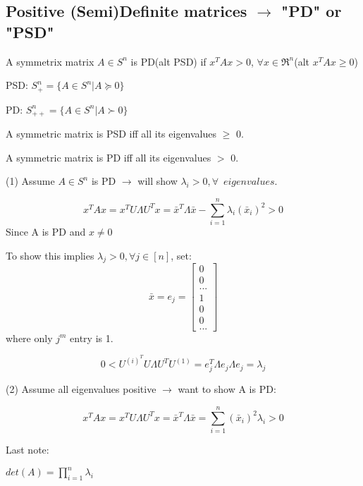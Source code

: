 \subsection{Positive (Semi)Definite matrices $\rightarrow$ "PD" or "PSD"}

\begin{definition}
	A symmetrix matrix $A\in S^n$ is PD(alt PSD) if $x^TAx > 0$, $\forall x\in \Re^n$(alt $x^TAx\geq 0$)
\end{definition}

PSD: $S^n_{+} = \{A\in S^n | A\succeq 0\}$

PD: $S^n_{++} = \{A\in S^n | A\succ 0\}$

A symmetric matrix is PSD iff all its eigenvalues $\geq$ 0.

A symmetric matrix is PD iff all its eigenvalues $>$ 0.


(1) Assume $A\in S^n$ is PD $\rightarrow$ will show $\lambda_i > 0, \forall\,\,\, eigenvalues$.   

\begin{equation*}
x^TAx = x^TU\Lambda U^Tx = \bar{x}^T\Lambda\bar{x} - \sum^n_{i=1}\lambda_i(\bar{x}_i)^2 >0
\end{equation*}
Since A is PD and $x\neq 0$

To show this implies $\lambda_j > 0, \forall j\in [n]$, set:
$$\bar{x} = e_j = 
\left[
\begin{matrix}
0\\
0\\
...\\
1\\
0\\
0\\
...
\end{matrix}
\right]
$$
where only $j^m$ entry is 1.

\begin{equation*}
0 < U^{(i)^T} U\Lambda U^TU^{(1)} =e_j^T\Lambda e_j \Lambda e_j = \lambda_j
\end{equation*}



(2) Assume all eigenvalues positive $\rightarrow$ want to show A is PD:

\begin{equation*}
x^TAx =x^TU\Lambda U^Tx = \bar{x}^T\Lambda \bar{x} = \sum^n_{i=1}(\bar{x}_i)^2\lambda_i > 0
\end{equation*}

Last note:

$det(A) = \prod^n_{i=1}\lambda_i$

